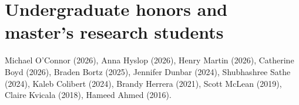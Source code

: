\documentclass[10.5pt]{article}
\begin{document}
\section{Undergraduate honors and master's research students}
Michael O'Connor (2026), Anna Hyslop (2026), Henry Martin (2026), Catherine Boyd (2026), Braden Bortz (2025), Jennifer Dunbar (2024), Shubhashree Sathe (2024), Kaleb Colibert (2024), Brandy Herrera (2021), Scott McLean (2019), Claire Kvicala (2018), Hameed Ahmed (2016).\par
{}
\end{document}
